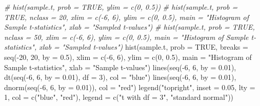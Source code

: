\documentclass[
]{article}
\newenvironment{Shaded}{\begin{snugshade}}{\end{snugshade}}
\newcommand{\AttributeTok}[1]{\textcolor[rgb]{0.77,0.63,0.00}{#1}}
\newcommand{\CommentTok}[1]{\textcolor[rgb]{0.56,0.35,0.01}{\textit{#1}}}
\newcommand{\ConstantTok}[1]{\textcolor[rgb]{0.00,0.00,0.00}{#1}}
\newcommand{\DecValTok}[1]{\textcolor[rgb]{0.00,0.00,0.81}{#1}}
\newcommand{\FloatTok}[1]{\textcolor[rgb]{0.00,0.00,0.81}{#1}}
\newcommand{\FunctionTok}[1]{\textcolor[rgb]{0.00,0.00,0.00}{#1}}
\newcommand{\NormalTok}[1]{#1}
\newcommand{\SpecialCharTok}[1]{\textcolor[rgb]{0.00,0.00,0.00}{#1}}
\newcommand{\StringTok}[1]{\textcolor[rgb]{0.31,0.60,0.02}{#1}}
\begin{document}
\begin{Shaded}
\begin{Highlighting}[]
\CommentTok{\# hist(sample.t, prob = TRUE, ylim = c(0, 0.5))}
\CommentTok{\# hist(sample.t, prob = TRUE, nclass = 20, xlim = c({-}6, 6), ylim = c(0, 0.5), main = "Histogram of Sample t{-}statistics", xlab = "Sampled t{-}values")}
\CommentTok{\# hist(sample.t, prob = TRUE, nclass = 50, xlim = c({-}6, 6), ylim = c(0, 0.5), main = "Histogram of Sample t{-}statistics", xlab = "Sampled t{-}values")}
\FunctionTok{hist}\NormalTok{(sample.t, }\AttributeTok{prob =} \ConstantTok{TRUE}\NormalTok{, }\AttributeTok{breaks =} \FunctionTok{seq}\NormalTok{(}\SpecialCharTok{{-}}\DecValTok{20}\NormalTok{, }\DecValTok{20}\NormalTok{, }\AttributeTok{by =} \FloatTok{0.5}\NormalTok{), }\AttributeTok{xlim =} \FunctionTok{c}\NormalTok{(}\SpecialCharTok{{-}}\DecValTok{6}\NormalTok{, }\DecValTok{6}\NormalTok{), }\AttributeTok{ylim =} \FunctionTok{c}\NormalTok{(}\DecValTok{0}\NormalTok{, }\FloatTok{0.5}\NormalTok{), }\AttributeTok{main =} \StringTok{"Histogram of Sample t{-}statistics"}\NormalTok{, }\AttributeTok{xlab =} \StringTok{"Sample t{-}values"}\NormalTok{)}
\FunctionTok{lines}\NormalTok{(}\FunctionTok{seq}\NormalTok{(}\SpecialCharTok{{-}}\DecValTok{6}\NormalTok{, }\DecValTok{6}\NormalTok{, }\AttributeTok{by =} \FloatTok{0.01}\NormalTok{), }\FunctionTok{dt}\NormalTok{(}\FunctionTok{seq}\NormalTok{(}\SpecialCharTok{{-}}\DecValTok{6}\NormalTok{, }\DecValTok{6}\NormalTok{, }\AttributeTok{by =} \FloatTok{0.01}\NormalTok{), }\AttributeTok{df =} \DecValTok{3}\NormalTok{), }\AttributeTok{col =} \StringTok{"blue"}\NormalTok{)}
\FunctionTok{lines}\NormalTok{(}\FunctionTok{seq}\NormalTok{(}\SpecialCharTok{{-}}\DecValTok{6}\NormalTok{, }\DecValTok{6}\NormalTok{, }\AttributeTok{by =} \FloatTok{0.01}\NormalTok{), }\FunctionTok{dnorm}\NormalTok{(}\FunctionTok{seq}\NormalTok{(}\SpecialCharTok{{-}}\DecValTok{6}\NormalTok{, }\DecValTok{6}\NormalTok{, }\AttributeTok{by =} \FloatTok{0.01}\NormalTok{)), }\AttributeTok{col =} \StringTok{"red"}\NormalTok{)}
\FunctionTok{legend}\NormalTok{(}\StringTok{"topright"}\NormalTok{, }\AttributeTok{inset =} \FloatTok{0.05}\NormalTok{, }\AttributeTok{lty =} \DecValTok{1}\NormalTok{, }\AttributeTok{col =} \FunctionTok{c}\NormalTok{(}\StringTok{"blue"}\NormalTok{, }\StringTok{"red"}\NormalTok{), }\AttributeTok{legend =} \FunctionTok{c}\NormalTok{(}\StringTok{"t with df = 3"}\NormalTok{, }\StringTok{"standard normal"}\NormalTok{))}
\end{Highlighting}
\end{Shaded}
\end{document}

